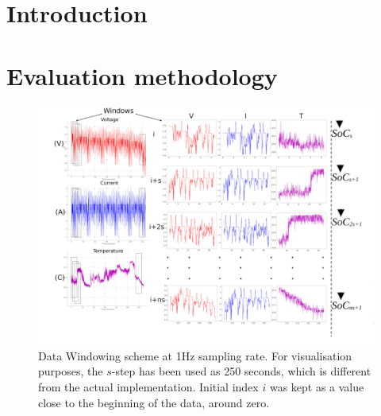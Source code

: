 \documentclass[journal]{IEEEtranTIE}
\begin{document}
%
{}


\section{Introduction} \label{sec:Introduction}

% 
\section{Evaluation methodology} \label{sec:Meth}

    
    
    
    
    \begin{landscape}
        \begin{figure}[ht]
            \centering
            \includegraphics[width=\linewidth]{II_Body/images/windowing3f-A3.jpg}
            \caption{Data Windowing scheme at 1Hz sampling rate. For visualisation purposes, the $s$-step has been used as 250 seconds, which is different from the actual implementation. Initial index $i$ was kept as a value close to the beginning of the data, around zero.}
            \label{fig:Windowing3f}
        \end{figure}
    \end{landscape}
\end{document}
